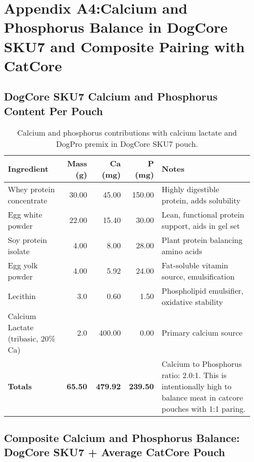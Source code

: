 
\appendix  
\section*{Appendix A4:Calcium and Phosphorus Balance in DogCore SKU7 and Composite Pairing with CatCore}  
\label{appendixA4}  

\subsection*{DogCore SKU7 Calcium and Phosphorus Content Per Pouch}  
\begin{table}[htbp]  
\centering  
\begin{tabular}{@{}l r r r p{7.5cm}@{}}  
\toprule  
Ingredient & Mass (g) & Ca (mg) & P (mg) & Notes \\  
\midrule  
Whey protein concentrate & 30.00 & 45.00 & 150.00 & Highly digestible protein, adds solubility \\  
Egg white powder & 22.00 & 15.40 & 30.00 & Lean, functional protein support, aids in gel set \\  
Soy protein isolate & 4.00 & 8.00 & 28.00 & Plant protein balancing amino acids \\  
Egg yolk powder & 4.00 & 5.92 & 24.00 & Fat-soluble vitamin source, emulsification \\   
Lecithin & 3.0 & 0.60 & 1.50 & Phospholipid emulsifier, oxidative stability \\  
Calcium Lactate (tribasic, 20\% Ca) & 2.0 & 400.00 & 0.00 & Primary calcium source \\  
\midrule  
\textbf{Totals} & \textbf{65.50} & \textbf{479.92} & \textbf{239.50} & Calcium to Phosphorus ratio: 2.0:1. This is intentionally high to balance meat in catcore pouches with 1:1 paring.  \\  
\bottomrule  
\end{tabular}  
\caption*{Calcium and phosphorus contributions with calcium lactate and DogPro premix in DogCore SKU7 pouch.}  
\end{table}  

\subsection*{Composite Calcium and Phosphorus Balance: DogCore SKU7 + Average CatCore Pouch}  

